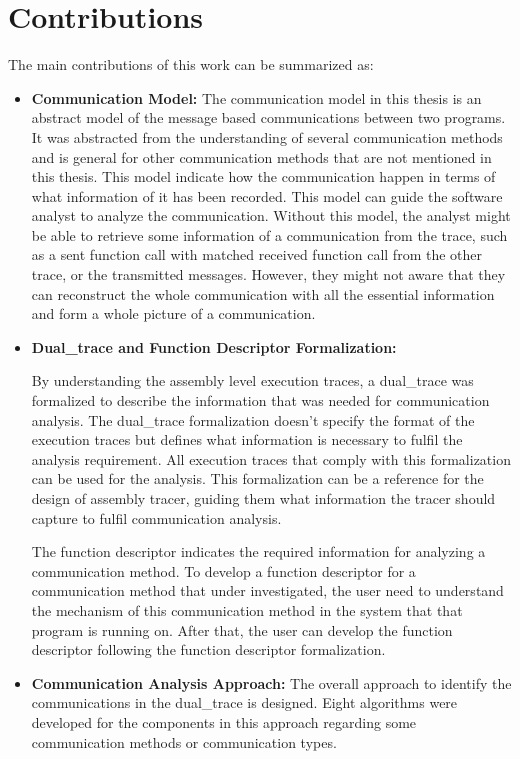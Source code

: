 \section{Contributions}
The main contributions of this work can be summarized as:
\begin{itemize}
  \item \textbf{Communication Model:} The communication model in this thesis is an abstract model of the message based communications between two programs. It was abstracted from the understanding of several communication methods and is general for other communication methods that are not mentioned in this thesis. This model indicate how the communication happen in terms of what information of it has been recorded. This model can guide the software analyst to analyze the communication. Without this model, the analyst might be able to retrieve some information of a communication from the trace, such as a sent function call with matched received function call from the other trace, or the transmitted messages. However, they might not aware that they can reconstruct the whole communication with all the essential information and form a whole picture of a communication.
  \item \textbf{Dual\_trace and Function Descriptor Formalization:} 
  
By understanding the assembly level execution traces, a dual\_trace was formalized to describe the information that was needed for communication analysis. The dual\_trace formalization doesn't specify the format of the execution traces but defines what information is necessary to fulfil the analysis requirement. All execution traces that comply with this formalization can be used for the analysis. This formalization can be a reference for the design of assembly tracer, guiding them what information the tracer should capture to fulfil communication analysis.

The function descriptor indicates the required information for analyzing a communication method. To develop a function descriptor for a communication method that under investigated, the user need to understand the mechanism of this communication method in the system that that program is running on. After that, the user can develop the function descriptor following the function descriptor formalization.

  \item \textbf{Communication Analysis Approach:} The overall approach to identify the communications in the dual\_trace is designed. Eight algorithms were developed for the components in this approach regarding some communication methods or communication types. 
  

\end{itemize}
